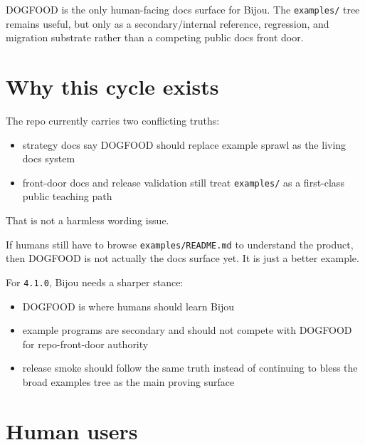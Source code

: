 DOGFOOD is the only human-facing docs surface for Bijou. The \texttt{e\allowbreak{}x\allowbreak{}a\allowbreak{}m\allowbreak{}p\allowbreak{}l\allowbreak{}e\allowbreak{}s\allowbreak{}/} tree remains useful, but only as a secondary/internal reference, regression, and migration substrate rather than a competing public docs front door.

\section{Why this cycle exists}\label{record-086-why-this-cycle-exists}

The repo currently carries two conflicting truths:

\begin{itemize}
\tightlist
\item
  strategy docs say DOGFOOD should replace example sprawl as the living docs system
\item
  front-door docs and release validation still treat \texttt{e\allowbreak{}x\allowbreak{}a\allowbreak{}m\allowbreak{}p\allowbreak{}l\allowbreak{}e\allowbreak{}s\allowbreak{}/} as a first-class public teaching path
\end{itemize}

That is not a harmless wording issue.

If humans still have to browse \texttt{e\allowbreak{}x\allowbreak{}a\allowbreak{}m\allowbreak{}p\allowbreak{}l\allowbreak{}e\allowbreak{}s\allowbreak{}/\allowbreak{}R\allowbreak{}E\allowbreak{}A\allowbreak{}D\allowbreak{}M\allowbreak{}E\allowbreak{}.\allowbreak{}m\allowbreak{}d} to understand the product, then DOGFOOD is not actually the docs surface yet. It is just a better example.

For \texttt{4\allowbreak{}.\allowbreak{}1\allowbreak{}.\allowbreak{}0}, Bijou needs a sharper stance:

\begin{itemize}
\tightlist
\item
  DOGFOOD is where humans should learn Bijou
\item
  example programs are secondary and should not compete with DOGFOOD for repo-front-door authority
\item
  release smoke should follow the same truth instead of continuing to bless the broad examples tree as the main proving surface
\end{itemize}

\section{Human users}\label{record-086-human-users}

